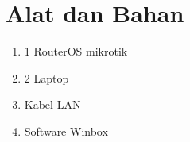 \section*{Alat dan Bahan}
\indent

\begin{enumerate}
    \item 1 RouterOS mikrotik
    \item 2 Laptop
    \item Kabel LAN
    \item Software Winbox
\end{enumerate}